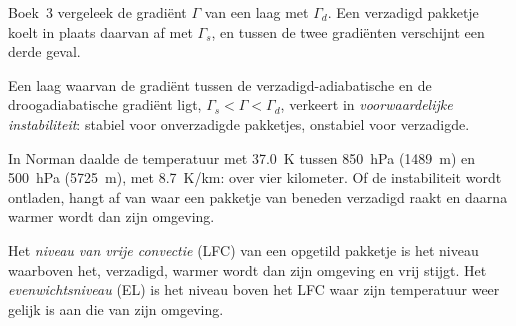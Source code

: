 Boek~3 vergeleek de gradiënt $\Gamma$ van een laag met $\Gamma_d$. Een verzadigd
pakketje koelt in plaats daarvan af met $\Gamma_s$, en tussen de twee gradiënten verschijnt een derde geval.

\begin{definition}\label{def:b2:atmospheric-thermodynamics:instability}
Een laag waarvan de gradiënt tussen de verzadigd-adiabatische en de droogadiabatische gradiënt ligt,
$\Gamma_s < \Gamma < \Gamma_d$, verkeert in \emph{voorwaardelijke instabiliteit}: stabiel voor onverzadigde pakketjes, onstabiel voor verzadigde.
\end{definition}

In Norman daalde de temperatuur met \qty{37.0}{K} tussen \qty{850}{hPa} (\qty{1489}{m}) en
\qty{500}{hPa} (\qty{5725}{m}), met \qty{8.7}{K/km}:  over vier kilometer.
Of de instabiliteit wordt ontladen, hangt af van waar een pakketje van beneden verzadigd raakt en
daarna warmer wordt dan zijn omgeving.

\begin{definition}\label{def:b2:atmospheric-thermodynamics:parcel-levels}
Het \emph{niveau van vrije convectie} (LFC) van een opgetild pakketje is
het niveau waarboven het, verzadigd, warmer wordt dan zijn omgeving en vrij stijgt. Het
\emph{evenwichtsniveau} (EL) is het niveau boven het LFC waar zijn
temperatuur weer gelijk is aan die van zijn omgeving.
\end{definition}

